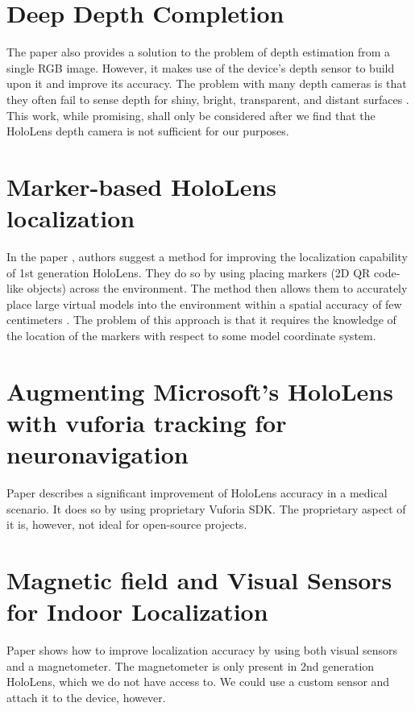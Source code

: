 \documentclass[twoside]{ctuthesis}
\theoremstyle{plain}
\theoremstyle{definition}
\theoremstyle{note}
\begin{document}
\section{Deep Depth Completion}
The paper \cite{DeepDepthCompletion} also provides a solution to the problem of depth estimation from a single RGB image. However, it makes use of the device's depth sensor to build upon it and improve its accuracy. The problem with many depth cameras is that they often fail to sense depth for shiny, bright, transparent, and distant surfaces \cite{DeepDepthCompletion}. This work, while promising, shall only be considered after we find that the HoloLens depth camera is not sufficient for our purposes.

\section{Marker-based HoloLens localization}
In the paper \cite{HoloLensMarkerBasedLocalization}, authors suggest a method for improving the localization capability of 1st generation HoloLens. They do so by using placing markers (2D QR code-like objects) across the environment. The method then allows them to accurately place large virtual models into the environment within a spatial accuracy of few centimeters \cite{HoloLensMarkerBasedLocalization}. The problem of this approach is that it requires the knowledge of the location of the markers with respect to some model coordinate system.

\section{Augmenting Microsoft’s HoloLens with vuforia tracking for neuronavigation}
Paper \cite{HoloLensVuforia} describes a significant improvement of HoloLens accuracy in a medical scenario. It does so by using proprietary Vuforia SDK. The proprietary aspect of it is, however, not ideal for open-source projects.

\section{Magnetic field and Visual Sensors for Indoor Localization}
Paper \cite{MagneticAndVisualIndoorLocalization} shows how to improve localization accuracy by using both visual sensors and a magnetometer. The magnetometer is only present in 2nd generation HoloLens, which we do not have access to. We could use a custom sensor and attach it to the device, however.
\end{document}
